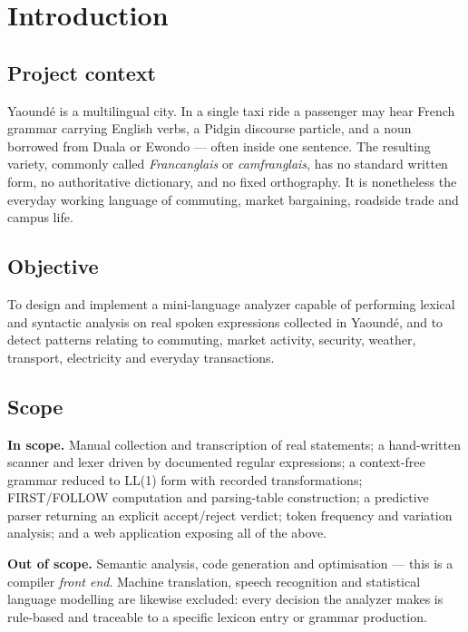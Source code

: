 \section{Introduction}\label{sec:intro}

\subsection{Project context}

Yaound\'e is a multilingual city. In a single taxi ride a passenger may hear French
grammar carrying English verbs, a Pidgin discourse particle, and a noun borrowed from
Duala or Ewondo --- often inside one sentence. The resulting variety, commonly called
\emph{Francanglais} or \emph{camfranglais}, has no standard written form, no authoritative
dictionary, and no fixed orthography. It is nonetheless the everyday working language of
commuting, market bargaining, roadside trade and campus life.

\subsection{Objective}

To design and implement a mini-language analyzer capable of performing lexical and
syntactic analysis on real spoken expressions collected in Yaound\'e, and to detect
patterns relating to commuting, market activity, security, weather, transport, electricity
and everyday transactions.

\subsection{Scope}

\textbf{In scope.} Manual collection and transcription of real statements; a hand-written
scanner and lexer driven by documented regular expressions; a context-free grammar reduced
to LL(1) form with recorded transformations; FIRST/FOLLOW computation and parsing-table
construction; a predictive parser returning an explicit accept/reject verdict; token
frequency and variation analysis; and a web application exposing all of the above.

\textbf{Out of scope.} Semantic analysis, code generation and optimisation --- this is a
compiler \emph{front end}. Machine translation, speech recognition and statistical
language modelling are likewise excluded: every decision the analyzer makes is rule-based
and traceable to a specific lexicon entry or grammar production.

